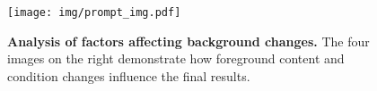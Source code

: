 \begin{figure}[t]
    \centering
    \texttt{[image: img/prompt\_img.pdf]}
    \caption{\textbf{Analysis of factors affecting background changes.} The four images on the right demonstrate how foreground content and condition changes influence the final results.}
    \label{fig:change}
    \vspace{-10pt}
\end{figure}
